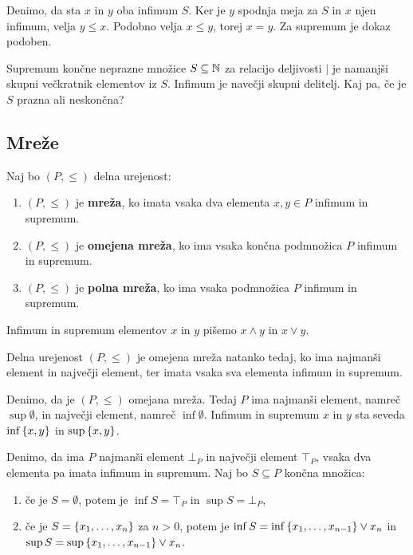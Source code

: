 \begin{dokaz}
  Denimo, da sta $x$ in $y$ oba infimum $S$. Ker je $y$ spodnja meja za
  $S$ in $x$ njen infimum, velja $y \leq x$. Podobno velja $x \leq y$, torej $x = y$. Za
  supremum je dokaz podoben.
\end{dokaz}

\begin{primer}
  Supremum končne neprazne množice $S \subseteq \mathbb{N}$ za relacijo deljivosti $\mid$
  je namanjši skupni večkratnik elementov iz $S$. Infimum je navečji skupni
  delitelj. Kaj pa, če je $S$ prazna ali neskončna?
\end{primer}

\subsection{Mreže}

\begin{definicija}
  Naj bo $(P, {\leq})$ delna urejenost:
  \begin{enumerate}
  \item $(P, \leq)$ je \textbf{mreža}, ko imata vsaka dva elementa $x, y \in P$ infimum in supremum.

  \item $(P, \leq)$ je \textbf{omejena mreža}, ko ima vsaka končna podmnožica $P$ infimum in supremum.

  \item $(P, \leq)$ je \textbf{polna mreža}, ko ima vsaka podmnožica $P$ infimum in supremum.
  \end{enumerate}
  Infimum in supremum elementov $x$ in $y$ pišemo $x \land y$ in $x \lor y$.
\end{definicija}

\begin{izrek}
  Delna urejenost $(P, {\leq})$ je omejena mreža natanko tedaj, ko ima
  najmanši element in največji element, ter imata vsaka sva elementa infimum in supremum.
\end{izrek}

\begin{dokaz}
  Denimo, da je $(P, \leq)$ omejana mreža. Tedaj $P$ ima najmanši element, namreč
  $\sup \emptyset$, in največji element, namreč $\inf \emptyset$. Infimum in supremum $x$ in $y$ sta seveda $\inf \left\{x, y\right\}$ in $\sup \left\{x, y\right\}$.

  Denimo, da ima $P$ najmanši element $\bot_P$ in največji element $\top_P$, vsaka dva
  elementa pa imata infimum in supremum. Naj bo $S \subseteq P$ končna množica:
  \begin{enumerate}
  \item če je $S = \emptyset$, potem je $\inf S = \top_P$ in $\sup S = \bot_P$,
  \item če je $S = \left\{x_1, \ldots, x_n\right\}$ za $n > 0$, potem je $\inf S = \inf \left\{x_1, \ldots, x_{n-1}\right\} \lor x_n$ in $\sup S = \sup \left\{x_1, \ldots, x_{n-1}\right\} \lor x_n$.
  \end{enumerate}
\end{dokaz}

